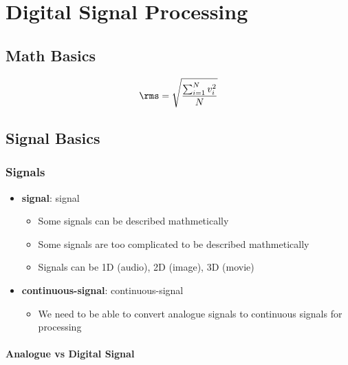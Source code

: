 \chapter{Digital Signal Processing}

\section{Math Basics}

  \begin{equation}
    \rms = \sqrt{\frac{\sum_{i = 1}^{N} v_{i}^{2}}{N}}
  \end{equation}

\section{Signal Basics}

  \subsection{Signals}

    \begin{itemize}
      \item \textbf{\Gls{signal}}: \glsdesc{signal}
      \begin{itemize}
        \item Some signals can be described mathmetically
        \item Some signals are too complicated to be described mathmetically
        \item Signals can be 1D (audio), 2D (image), 3D (movie)
      \end{itemize}

      \item \textbf{\Gls{continuous-signal}}: \glsdesc{continuous-signal}
      \begin{itemize}
        \item We need to be able to convert analogue signals to continuous signals
        for processing
      \end{itemize}
    \end{itemize}

    \subsubsection{Analogue vs Digital Signal}

